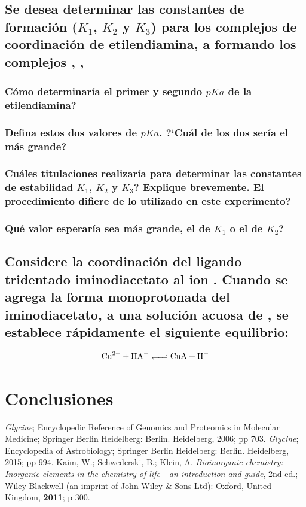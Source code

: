 \documentclass[fleqn,10pt]{SelfArx} %
\begin{document}
	\subsection{Se desea determinar las constantes de formaci\'on ($K_1$, $K_2$ y $K_3$) para los complejos de coordinaci\'on de etilendiamina, a  formando los complejos , , }
	\subsubsection{C\'omo determinar\'ia el primer y segundo $pKa$ de la etilendiamina?}
	\subsubsection{Defina estos dos valores de $pKa$. ?`Cu\'al de los dos ser\'ia el m\'as grande?}
	\subsubsection{Cu\'ales titulaciones realizar\'ia para determinar las constantes de estabilidad $K_1$, $K_2$ y $K_3$? Explique brevemente. El procedimiento difiere de lo utilizado en este experimento?}
	\subsubsection{Qu\'e valor esperar\'ia sea m\'as grande, el de $K_1$ o el de $K_2$?}
	
	\subsection{Considere la coordinaci\'on del ligando tridentado iminodiacetato al ion . Cuando se agrega la forma monoprotonada del iminodiacetato, a una soluci\'on acuosa de , se establece r\'apidamente el siguiente equilibrio:}
	\begin{equation}
	    \ce{Cu^{2+} + HA- <=> CuA + H+}
	\end{equation}
	
	\section{Conclusiones}
	
	
	\begin{thebibliography}{9}
	    \textit{Glycine}; Encyclopedic Reference of Genomics and Proteomics in Molecular Medicine; Springer Berlin Heidelberg: Berlin. Heidelberg, 2006; pp 703.
	    \textit{Glycine}; Encyclopedia of Astrobiology; Springer Berlin Heidelberg: Berlin. Heidelberg, 2015; pp 994.
	    Kaim, W.; Schwederski, B.; Klein, A. \textit{Bioinorganic chemistry: Inorganic elements in the chemistry of life - an introduction and guide}, 2nd ed.; Wiley-Blackwell (an imprint of John Wiley \& Sons Ltd): Oxford, United Kingdom, \textbf{2011}; p 300.
	\end{thebibliography}
\end{document}
